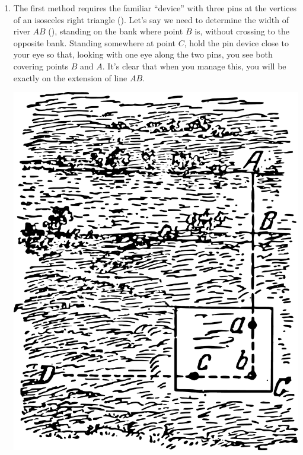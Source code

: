 \begin{enumerate}
\item The first method requires the familiar ``device'' with three pins at the vertices of an isosceles right triangle (). 
Let's say we need to determine the width of river $AB$ (), standing on the bank where point $B$ is, without crossing to the opposite bank. Standing somewhere at point $C$, hold the pin device close to your eye so that, looking with one eye along the two pins, you see both covering points $B$ and $A$. It's clear that when you manage this, you will be exactly on the extension of line $AB$. 

\begin{marginfigure}[-1.5cm]%
\centering
\includegraphics[width=\textwidth]{figures/ch-02/fig-026.pdf}
\end{marginfigure}
\begin{marginfigure}[5cm]%
\centering

\end{marginfigure}
\end{enumerate}
